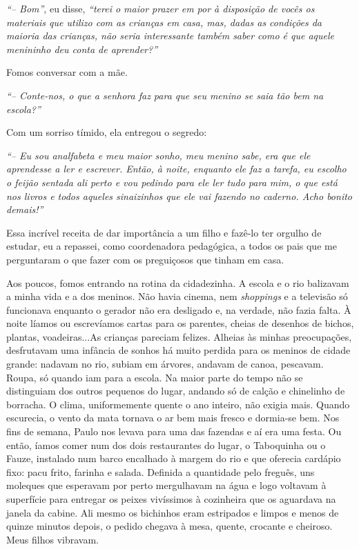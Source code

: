 \textit{``-- Bom''}, eu disse, \textit{``terei o maior prazer em por à disposição de vocês os materiais que utilizo com as crianças em casa, mas, dadas as condições da maioria das crianças, não seria interessante também saber como é que aquele menininho deu conta de aprender?''} 

Fomos conversar com a mãe.

\textit{``-- Conte-nos, o que a senhora faz para que seu menino se saia tão bem na escola?''}

Com um sorriso tímido, ela entregou o segredo:

\textit{``-- Eu sou analfabeta e meu maior sonho, meu menino sabe, era que ele aprendesse a ler e escrever.
Então, à noite, enquanto ele faz a tarefa, eu escolho o feijão sentada ali perto e vou pedindo para ele ler tudo para mim, o que está nos livros e todos aqueles sinaizinhos que ele vai fazendo no caderno.
Acho bonito demais!'' }

Essa incrível receita de dar importância a um filho e fazê-lo ter orgulho de estudar, eu a repassei, como coordenadora pedagógica, a todos os pais que me perguntaram o que fazer com os preguiçosos que tinham em casa.

Aos poucos, fomos entrando na rotina da cidadezinha.
A escola e o rio balizavam a minha vida e a dos meninos.
Não havia cinema, nem \textit{shoppings} e a televisão só funcionava enquanto o gerador não era desligado e, na verdade, não fazia falta.
À noite líamos ou escrevíamos cartas para os parentes, cheias de desenhos de bichos, plantas, voadeiras...As crianças pareciam felizes.
Alheias às minhas preocupações, desfrutavam uma infância de sonhos há muito perdida para os meninos de cidade grande: nadavam no rio, subiam em árvores, andavam de canoa, pescavam.
Roupa, só quando iam para a escola.
Na maior parte do tempo não se distinguiam dos outros pequenos do lugar, andando só de calção e chinelinho de borracha.
O clima, uniformemente quente o ano inteiro, não exigia mais.
Quando escurecia, o vento da mata tornava o ar bem mais fresco e dormia-se bem.
Nos fins de semana, Paulo nos levava para uma das fazendas e aí era uma festa.
Ou então, íamos comer num dos dois restaurantes do lugar, o Taboquinha ou o Fauze, instalado num barco encalhado à margem do rio e que oferecia cardápio fixo: pacu frito, farinha e salada.
Definida a quantidade pelo freguês, uns moleques que esperavam por perto mergulhavam na água e logo voltavam à superfície para entregar os peixes vivíssimos à cozinheira que os aguardava na janela da cabine.
Ali mesmo os bichinhos eram estripados e limpos e menos de quinze minutos depois, o pedido chegava à mesa, quente, crocante e cheiroso.
Meus filhos vibravam.

